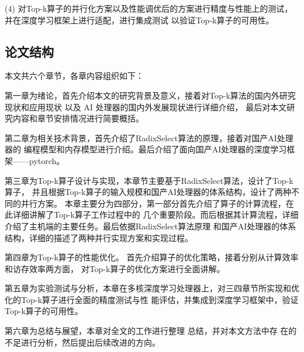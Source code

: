 (4) 对Top-k算子的并行化方案以及性能调优后的方案进行精度与性能上的测试，并在深度学习框架上进行适配，进行集成测试
以验证Top-k算子的可用性。

\subsection{论文结构}

本文共六个章节，各章内容组织如下： 

第一章为绪论，首先介绍本文的研究背景及意义，接着对Top-k算法的国内外研究现状和应用现状
以及 AI 处理器的国内外发展现状进行详细介绍，
最后对本文研究内容和章节安排情况进行简要概括。

第二章为相关技术背景，首先介绍了RadixSelect算法的原理，接着对国产AI处理器的
编程模型和内存模型进行介绍。最后介绍了面向国产AI处理器的深度学习框架——pytorch。


第三章为Top-k算子设计与实现，本章节主要基于RadixSelect算法，设计了Top-k算子，
并且根据Top-k算子的输入规模和国产AI处理器的体系结构，设计了两种不同的并行方案。
本章主要分为四部分，第一部分首先介绍了算子的计算流程，在此详细讲解了Top-k算子工作过程中的
几个重要阶段。而后根据其计算流程，详细介绍了主机端的主要任务。最后依据RadixSelect算法原理
和国产AI处理器的体系结构，详细的描述了两种并行实现方案和实现过程。

第四章为Top-k算子的性能优化。
首先介绍算子的优化策略，接着分别从计算效率和访存效率两方面，
对Top-k算子的优化方案进行全面讲解。
 
 第五章为实验测试与分析，本章在多核深度学习处理器上，对三四章节所实现和优化的Top-k算子进行全面的精度测试与性
 能评估，并集成到深度学习框架中，验证Top-k算子的可用性。 
 
 第六章为总结与展望，本章对全文的工作进行整理
 总结，并对本文方法中存 在的不足进行分析，然后提出后续改进的方向。
